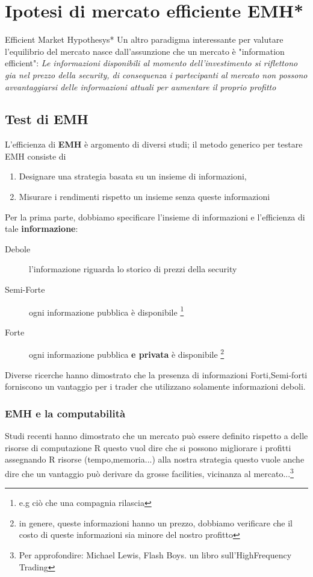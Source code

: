 \documentclass[a4paper,11pt]{report}
\begin{document}
{\section{Ipotesi di mercato efficiente EMH*}
	{\tiny{Efficient Market Hypothesys*}} \newline
	Un altro paradigma interessante per valutare l'equilibrio del mercato nasce dall'assunzione che un mercato è "information efficient": \newline
	\emph{ Le informazioni disponibili al momento dell'investimento si riflettono gia nel prezzo della security, di consequenza i partecipanti al mercato non possono avvantaggiarsi delle informazioni attuali per aumentare il proprio profitto}

\subsection{Test di EMH}
	L'efficienza di \textbf{EMH} è argomento di diversi studi; \newline
	il metodo generico per testare EMH consiste di
\begin{enumerate}
	\item Designare una strategia basata su un insieme di informazioni,
	\item Misurare i rendimenti rispetto un insieme senza queste informazioni
\end{enumerate}
	Per la prima parte, dobbiamo specificare l'insieme di informazioni e l'efficienza di tale \textbf{informazione}:
\begin{description}
	\item[Debole] l'informazione riguarda lo storico di prezzi della security
	\item[Semi-Forte] ogni informazione pubblica è disponibile \footnote{e.g ciò che una compagnia rilascia}
	\item[Forte] ogni informazione pubblica \textbf{e privata} è disponibile \footnote{in genere, queste informazioni hanno un prezzo, dobbiamo verificare che il costo di queste informazioni sia minore del nostro profitto}
\end{description}
	Diverse ricerche hanno dimostrato che la presenza di informazioni Forti,Semi-forti forniscono un vantaggio per i trader che 		utilizzano solamente informazioni deboli. \newline
\subsubsection{EMH e la computabilità}
	Studi recenti hanno dimostrato che un mercato può essere definito rispetto	 a delle risorse di computazione R
	questo vuol dire che si possono migliorare i profitti assegnando R risorse (tempo,memoria...) alla nostra strategia
	questo vuole anche dire che un vantaggio può derivare da grosse facilities, vicinanza al mercato...\footnote{Per approfondire: Michael Lewis, Flash Boys. un libro sull'HighFrequency Trading} %
\newpage

}
\end{document}
